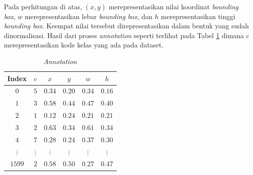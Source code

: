     Pada perhitungan di atas, $(x, y)$ merepresentasikan nilai koordinat \textit{bounding box}, $w$ merepresentasikan lebar \textit{bounding box}, dan $h$ merepresentasikan tinggi \textit{bounding box}. Keempat nilai tersebut direpresentasikan dalam bentuk yang sudah dinormalisasi. Hasil dari proses \textit{annotation} seperti terlihat pada Tabel \ref{tab:d-annotation} dimana $c$ merepresentasikan kode kelas yang ada pada dataset.

    \begin{table}[H]
        \caption{\textit{Annotation}}
        \centering
        \begin{tabular}{cccccc}
            \hline
            Index       &$c$        &$x$        &$y$        &$w$        &$h$ \\ \hline
            $0$         &$5$        &$0.34$     &$0.20$     &$0.34$     &$0.16$ \\ \hline
            $1$         &$3$        &$0.58$     &$0.44$     &$0.47$     &$0.40$ \\ \hline
            $2$         &$1$        &$0.12$     &$0.24$     &$0.21$     &$0.21$ \\ \hline
            $3$         &$2$        &$0.63$     &$0.34$     &$0.61$     &$0.34$ \\ \hline
            $4$         &$7$        &$0.28$     &$0.24$     &$0.37$     &$0.30$ \\ \hline
            $\vdots$    &$\vdots$   &$\vdots$   &$\vdots$   &$\vdots$   &$\vdots$ \\ \hline
            $1599$      &$2$        &$0.58$     &$0.50$     &$0.27$     &$0.47$ \\ \hline
        \end{tabular}
        \label{tab:d-annotation}
    \end{table}

